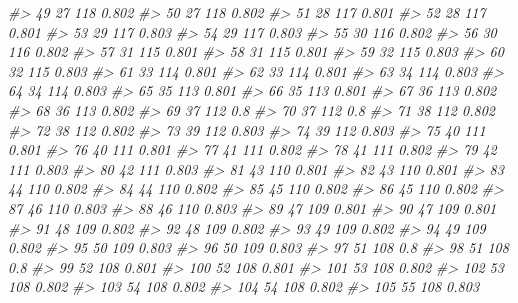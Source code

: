 \documentclass[]{book}
\newenvironment{Shaded}{\begin{snugshade}}{\end{snugshade}}
\newcommand{\CommentTok}[1]{\textcolor[rgb]{0.56,0.35,0.01}{\textit{#1}}}
\begin{document}
\begin{Shaded}
\begin{Highlighting}[]
\CommentTok{#> 49          27      118 0.802}
\CommentTok{#> 50          27      118 0.802}
\CommentTok{#> 51          28      117 0.801}
\CommentTok{#> 52          28      117 0.801}
\CommentTok{#> 53          29      117 0.803}
\CommentTok{#> 54          29      117 0.803}
\CommentTok{#> 55          30      116 0.802}
\CommentTok{#> 56          30      116 0.802}
\CommentTok{#> 57          31      115 0.801}
\CommentTok{#> 58          31      115 0.801}
\CommentTok{#> 59          32      115 0.803}
\CommentTok{#> 60          32      115 0.803}
\CommentTok{#> 61          33      114 0.801}
\CommentTok{#> 62          33      114 0.801}
\CommentTok{#> 63          34      114 0.803}
\CommentTok{#> 64          34      114 0.803}
\CommentTok{#> 65          35      113 0.801}
\CommentTok{#> 66          35      113 0.801}
\CommentTok{#> 67          36      113 0.802}
\CommentTok{#> 68          36      113 0.802}
\CommentTok{#> 69          37      112   0.8}
\CommentTok{#> 70          37      112   0.8}
\CommentTok{#> 71          38      112 0.802}
\CommentTok{#> 72          38      112 0.802}
\CommentTok{#> 73          39      112 0.803}
\CommentTok{#> 74          39      112 0.803}
\CommentTok{#> 75          40      111 0.801}
\CommentTok{#> 76          40      111 0.801}
\CommentTok{#> 77          41      111 0.802}
\CommentTok{#> 78          41      111 0.802}
\CommentTok{#> 79          42      111 0.803}
\CommentTok{#> 80          42      111 0.803}
\CommentTok{#> 81          43      110 0.801}
\CommentTok{#> 82          43      110 0.801}
\CommentTok{#> 83          44      110 0.802}
\CommentTok{#> 84          44      110 0.802}
\CommentTok{#> 85          45      110 0.802}
\CommentTok{#> 86          45      110 0.802}
\CommentTok{#> 87          46      110 0.803}
\CommentTok{#> 88          46      110 0.803}
\CommentTok{#> 89          47      109 0.801}
\CommentTok{#> 90          47      109 0.801}
\CommentTok{#> 91          48      109 0.802}
\CommentTok{#> 92          48      109 0.802}
\CommentTok{#> 93          49      109 0.802}
\CommentTok{#> 94          49      109 0.802}
\CommentTok{#> 95          50      109 0.803}
\CommentTok{#> 96          50      109 0.803}
\CommentTok{#> 97          51      108   0.8}
\CommentTok{#> 98          51      108   0.8}
\CommentTok{#> 99          52      108 0.801}
\CommentTok{#> 100         52      108 0.801}
\CommentTok{#> 101         53      108 0.802}
\CommentTok{#> 102         53      108 0.802}
\CommentTok{#> 103         54      108 0.802}
\CommentTok{#> 104         54      108 0.802}
\CommentTok{#> 105         55      108 0.803}

\end{Highlighting}
\end{Shaded}
\end{document}

